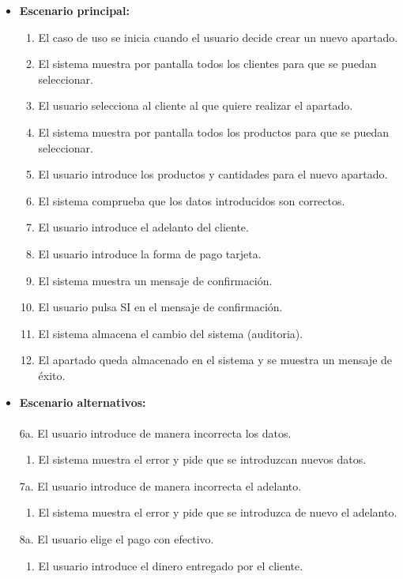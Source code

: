\begin{itemize}\renewcommand{\labelitemi}{$\circ$}
 \item \textbf{Escenario principal:}
         \begin{enumerate}
          \item El caso de uso se inicia cuando el usuario decide crear un nuevo apartado.
	\item El sistema muestra por pantalla todos los clientes para que se puedan seleccionar.
	\item El usuario selecciona al cliente al que quiere realizar el apartado.
	\item El sistema muestra por pantalla todos los productos para que se puedan seleccionar.
          \item El usuario introduce los productos y cantidades para el nuevo apartado.
	  \item El sistema comprueba que los datos introducidos son correctos.
	\item El usuario introduce el adelanto del cliente.
	  \item El usuario introduce la forma de pago tarjeta.
  	  \item El sistema muestra un mensaje de confirmación.
          \item El usuario pulsa SI en el mensaje de confirmación.
 	  \item El sistema almacena el cambio del sistema (auditoria).
          \item El apartado queda almacenado en el sistema y se muestra un mensaje de éxito.
         \end{enumerate}
  \item \textbf{Escenario alternativos:}\\\\
	  6a. El usuario introduce de manera incorrecta los datos.
		\begin{enumerate}
		 \item El sistema muestra el error y pide que se introduzcan nuevos datos.
		\end{enumerate}
	7a. El usuario introduce de manera incorrecta el adelanto.
		\begin{enumerate}
		 \item El sistema muestra el error y pide que se introduzca de nuevo el adelanto.
		\end{enumerate}
	8a. El usuario elige el pago con efectivo.
		\begin{enumerate}
		 \item El usuario introduce el dinero entregado por el cliente.

\end{enumerate}
\end{itemize}
